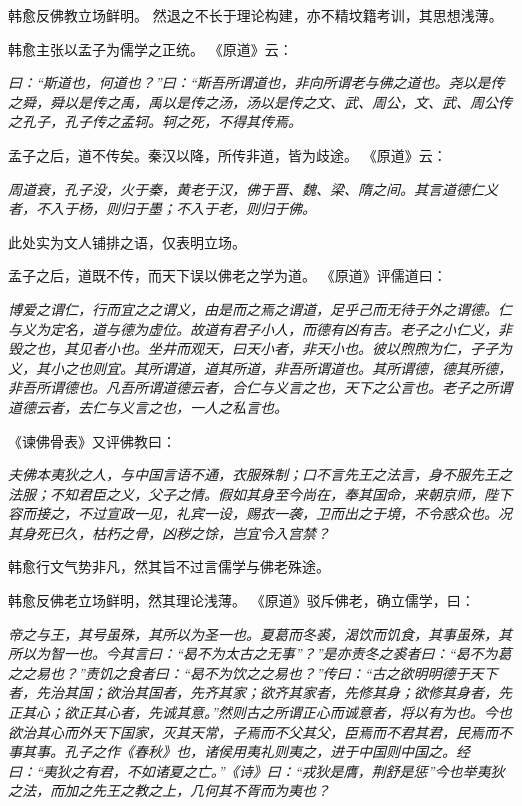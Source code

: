 \documentclass[11pt]{article}
\begin{document}
韩愈反佛教立场鲜明。
然退之不长于理论构建，亦不精坟籍考训，其思想浅薄。

\newline

韩愈主张以孟子为儒学之正统。
《原道》云：

\textit{曰：“斯道也，何道也？”曰：“斯吾所谓道也，非向所谓老与佛之道也。尧以是传之舜，舜以是传之禹，禹以是传之汤，汤以是传之文、武、周公，文、武、周公传之孔子，孔子传之孟轲。轲之死，不得其传焉。}

孟子之后，道不传矣。秦汉以降，所传非道，皆为歧途。
《原道》云：

\textit{周道衰，孔子没，火于秦，黄老于汉，佛于晋、魏、梁、隋之间。其言道德仁义者，不入于杨，则归于墨；不入于老，则归于佛。}

此处实为文人铺排之语，仅表明立场。

\newline

孟子之后，道既不传，而天下误以佛老之学为道。
《原道》评儒道曰：

\textit{博爱之谓仁，行而宜之之谓义，由是而之焉之谓道，足乎己而无待于外之谓德。仁与义为定名，道与德为虚位。故道有君子小人，而德有凶有吉。老子之小仁义，非毁之也，其见者小也。坐井而观天，曰天小者，非天小也。彼以煦煦为仁，孑孑为义，其小之也则宜。其所谓道，道其所道，非吾所谓道也。其所谓德，德其所德，非吾所谓德也。凡吾所谓道德云者，合仁与义言之也，天下之公言也。老子之所谓道德云者，去仁与义言之也，一人之私言也。}

《谏佛骨表》又评佛教曰：

\textit{夫佛本夷狄之人，与中国言语不通，衣服殊制；口不言先王之法言，身不服先王之法服；不知君臣之义，父子之情。假如其身至今尚在，奉其国命，来朝京师，陛下容而接之，不过宣政一见，礼宾一设，赐衣一袭，卫而出之于境，不令惑众也。况其身死已久，枯朽之骨，凶秽之馀，岂宜令入宫禁？}

韩愈行文气势非凡，然其旨不过言儒学与佛老殊途。

\newline

韩愈反佛老立场鲜明，然其理论浅薄。
《原道》驳斥佛老，确立儒学，曰：

\textit{帝之与王，其号虽殊，其所以为圣一也。夏葛而冬裘，渴饮而饥食，其事虽殊，其所以为智一也。今其言曰：“曷不为太古之无事”？”是亦责冬之裘者曰：“曷不为葛之之易也？”责饥之食者曰：“曷不为饮之之易也？”传曰：“古之欲明明德于天下者，先治其国；欲治其国者，先齐其家；欲齐其家者，先修其身；欲修其身者，先正其心；欲正其心者，先诚其意。”然则古之所谓正心而诚意者，将以有为也。今也欲治其心而外天下国家，灭其天常，子焉而不父其父，臣焉而不君其君，民焉而不事其事。孔子之作《春秋》也，诸侯用夷礼则夷之，进于中国则中国之。经曰：“夷狄之有君，不如诸夏之亡。”《诗》曰：“戎狄是膺，荆舒是惩”今也举夷狄之法，而加之先王之教之上，几何其不胥而为夷也？}
\end{document}
